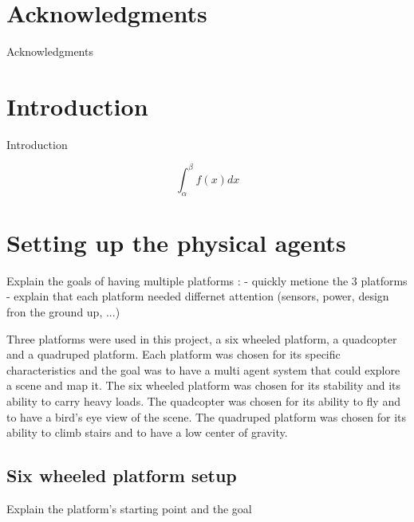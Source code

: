 \documentclass[11pt]{article}
\begin{document}
    \newpage
    \section*{Acknowledgments}

        Acknowledgments
        
    \newpage
    \thispagestyle{empty}
    \mbox{}
    \newpage
    \thispagestyle{empty}
    {\small \tableofcontents}

    \newpage
    \thispagestyle{empty}
    \mbox{}
    \newpage
    
    \section{Introduction}
    
        Introduction    

        $$
        \int_\alpha^\beta f(x) dx
        $$
        \cite{xu2022fast}


    \newpage
    
    \section[Setting up the physical agents]{Setting up the physical agents}
    \label{section:big title}%

        Explain the goals of having multiple platforms : 
        - quickly metione the 3 platforms
        - explain that each platform needed differnet attention (sensors, power, design fron the ground up, ...)

        Three platforms were used in this project, a six wheeled platform, a quadcopter and a quadruped platform. Each platform was chosen for its specific characteristics and the goal was to have a multi agent system that could explore a scene and map it. The six wheeled platform was chosen for its stability and its ability to carry heavy loads. The quadcopter was chosen for its ability to fly and to have a bird's eye view of the scene. The quadruped platform was chosen for its ability to climb stairs and to have a low center of gravity.

    
        \subsection{Six wheeled platform setup}

            Explain the platform's starting point and the goal
\end{document}
